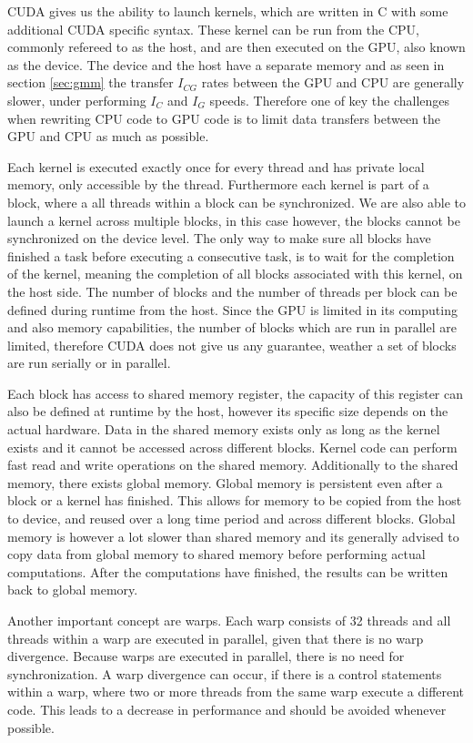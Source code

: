 \documentclass[]{article}
\begin{document}
CUDA gives us the ability to launch kernels, which are written in C with some additional CUDA specific syntax. These kernel can be run from the CPU, commonly refereed to as the host, and are then executed on the GPU, also known as the device. The device and the host have a separate memory and as seen in section \ref{sec:gmm} the transfer $I_{CG}$ rates between the GPU and CPU are generally slower, under performing $I_{C}$ and $I_G$ speeds. Therefore one of key the challenges when rewriting CPU code to GPU code is to limit data transfers between the GPU and CPU as much as possible.

Each kernel is executed exactly once for every thread and has private local memory, only accessible by the thread. Furthermore each kernel is part of a block, where a all threads within a block can be synchronized. We are also able to launch a kernel across multiple blocks, in this case however, the blocks cannot be synchronized on the device level. The only way to make sure all blocks have finished a task before executing a consecutive task, is to wait for the completion of the kernel, meaning the completion of all blocks associated with this kernel, on the host side. The number of blocks and the number of threads per block can be defined during runtime from the host. Since the GPU is limited in its computing and also memory capabilities, the number of blocks which are run in parallel are limited, therefore CUDA does not give us any guarantee, weather a set of blocks are run serially or in parallel.  

Each block has access to shared memory register, the capacity of this register can also be defined at runtime by the host, however its specific size depends on the actual hardware. Data in the shared memory exists only as long as the kernel exists and it cannot be accessed across different blocks. Kernel code can perform fast read and write operations on the shared memory. Additionally to the shared memory, there exists global memory. Global memory is persistent even after a block or a kernel has finished. This allows for memory to be copied from the host to device, and reused over a long time period and across different blocks. Global memory is however a lot slower than shared memory and its generally advised to copy data from global memory to shared memory before performing actual computations. After the computations have finished, the results can be written back to global memory.

Another important concept are warps. Each warp consists of 32 threads and all threads within a warp are executed in parallel, given that there is no warp divergence. Because warps are executed in parallel, there is no need for synchronization. A warp divergence can occur, if there is a control statements within a warp, where two or more threads from the same warp execute a different code. This leads to a decrease in performance and should be avoided whenever possible.
\end{document}
